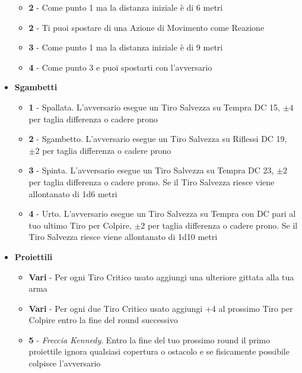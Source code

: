 \begin{multicols}{2}
\begin{itemize}[leftmargin=*]
\begin{itemize}[leftmargin=*]
		\item \textbf{2} - Come punto 1 ma la distanza iniziale è di 6 metri

		\item \textbf{2} - Ti puoi spostare di una Azione di Movimento come Reazione

		\item \textbf{3} - Come punto 1 ma la distanza iniziale è di 9 metri

		\item \textbf{4} - Come punto 3 e puoi spostarti con l'avversario
	\end{itemize}

	\item \textbf{Sgambetti}
	\begin{itemize}[leftmargin=*]
		\setlength{\itemsep}{0pt}
		\item \textbf{1} - Spallata. L'avversario esegue un Tiro Salvezza su Tempra DC 15, $ \pm 4 $ per taglia differenza o cadere prono

		\item \textbf{2} - Sgambetto. L'avversario esegue un Tiro Salvezza su Riflessi DC 19, $ \pm 2 $ per taglia differenza o cadere prono

		\item \textbf{3} - Spinta. L'avversario esegue un Tiro Salvezza su Tempra DC 23, $ \pm 2 $ per taglia differenza o cadere prono. Se il Tiro Salvezza riesce viene allontanato di 1d6 metri

		\item \textbf{4} - Urto. L'avversario esegue un Tiro Salvezza su Tempra con DC pari al tuo ultimo Tiro per Colpire, $ \pm 2 $ per taglia differenza o cadere prono. Se il Tiro Salvezza riesce viene allontanato di 1d10 metri
	\end{itemize}

	\item \textbf{Proiettili}
	\begin{itemize}[leftmargin=*]
		\setlength{\itemsep}{0pt}
		\item \textbf{Vari} - Per ogni Tiro Critico usato aggiungi una ulteriore gittata alla tua arma

		\item \textbf{Vari} - Per ogni due Tiro Critico usato aggiungi +4 al prossimo Tiro per Colpire entro la fine del round successivo

		\item \textbf{5} - \emph{Freccia Kennedy}. Entro la fine del tuo prossimo round il primo proiettile ignora qualsiasi copertura o ostacolo e se fisicamente possibile colpisce l'avversario
	\end{itemize}


\end{itemize}
\end{multicols}
